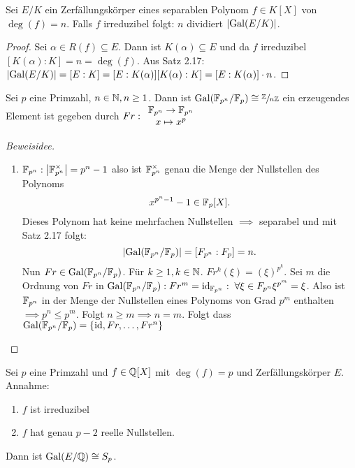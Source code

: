 \begin{corollary}
	Sei $E / K$ ein Zerfällungskörper eines separablen Polynom $f \in K[X]$ von $\deg(f) = n$. 
	Falls $f$ irreduzibel folgt: $n$ dividiert $\abs{\operatorname{Gal}(E/K)}$.
\end{corollary}

\begin{proof}
	Sei $\alpha \in R(f) \subseteq E$. Dann ist $K(\alpha) \subseteq E$ und da $f$ irreduzibel $[K(\alpha) : K] = n = \deg(f)$.
	Aus Satz 2.17: $\abs{\operatorname{Gal}(E/ K)} = [E:K] = [E: K(\alpha)] [K(\alpha) : K] = [E : K(\alpha)] \cdot n$.
\end{proof}

\begin{theorem}
	Sei $p$ eine Primzahl, $n \in \mathbb{N}, n \geq 1$. Dann ist $\operatorname{Gal}(\mathbb{F}_{p^{n}} / \mathbb{F}_{p}) \cong \sfrac{\mathbb{Z}}{n \mathbb{Z}}$ 
	ein erzeugendes Element ist gegeben durch $Fr:\begin{array}{c} \mathbb{F}_{p^{n}} \to \mathbb{F}_{p^{n}}\\ x \mapsto x^{p}\\ \end{array}$
\end{theorem}

\begin{proof}[Beweisidee]
	\begin{enumerate}
		\item $\mathbb{F}_{p^{n}}: \abs{\mathbb{F}_{p^{n}}^{\times}} = p^{n}-1$ also ist $\mathbb{F}_{p^{n}}^{\times}$ genau die Menge der Nullstellen des Polynoms
			\[
				x^{p^{n}-1} -1 \in \mathbb{F}_{p}[X]
			.\]
			Dieses Polynom hat keine mehrfachen Nullstellen $\implies$ separabel und mit Satz 2.17 folgt:
			\[
				\abs{\operatorname{Gal}(\mathbb{F}_{p^{n}} / \mathbb{F}_{p})} = [F_{p^{n}} : F_{p}] = n
			.\]
			Nun $Fr \in \operatorname{Gal}(\mathbb{F}_{p^{n}} / \mathbb{F}_{p})$. Für $k \geq 1, k \in \mathbb{N}$. $Fr^{k}(\xi) = (\xi)^{p^{k}}$.
			Sei $m$ die Ordnung von $Fr$ in $\gal(\F_{p^{n}} / \F_{p}): Fr^{m} = \id_{\F_{p^{n}}}: \forall \xi \in F_{p^{n}} \xi^{p^{m}} = \xi$.
			Also ist $\mathbb{F}_{p^{n}}$ in der Menge der Nullstellen eines Polynoms von Grad $p^{m}$ enthalten $\implies p^{n} \leq p^{m}$.
			Folgt $n \geq m \implies n = m$. Folgt dass $\operatorname{Gal}(\mathbb{F}_{p^{n}} / \mathbb{F}_{p}) = \{\operatorname{id}, Fr, \ldots, Fr^{n}\} $
	\end{enumerate}
\end{proof}

\begin{theorem}
	Sei $p$ eine Primzahl und $f \in \mathbb{Q}[X]$ mit $\deg(f) = p$ und Zerfällungskörper $E$. Annahme:
	\begin{enumerate}
		\item $f$ ist irreduzibel
		\item $f$ hat genau $p-2$ reelle Nullstellen.
	\end{enumerate}
	Dann ist $\operatorname{Gal}(E / \mathbb{Q}) \cong S_{p}$.
\end{theorem}

